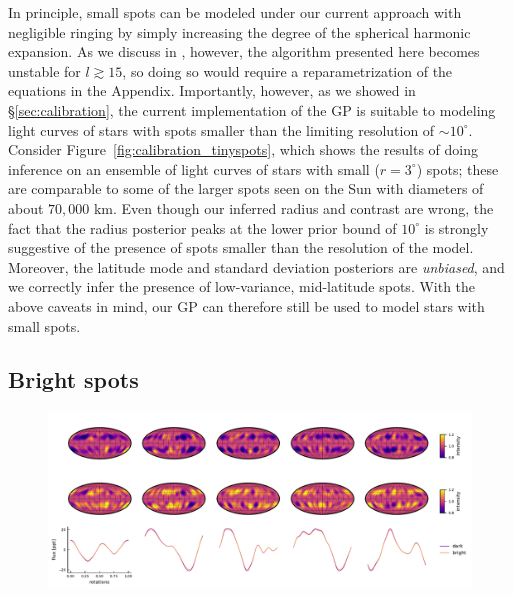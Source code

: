 \documentclass[modern,linenumbers]{aastex62}
\begin{document}
In principle, small spots can be modeled under our current
approach with negligible ringing by simply
increasing the degree of the spherical harmonic expansion. As we discuss in
\citep{JOSSPaper}, however, the algorithm presented here becomes
unstable for $l \gtrsim 15$, so doing so would require a reparametrization
of the equations in the Appendix. Importantly, however, as we showed in
\S\ref{sec:calibration}, the current implementation of the GP is suitable
to modeling light curves of stars with spots smaller than the limiting
resolution of $\sim 10^\circ$. Consider Figure~\ref{fig:calibration_tinyspots},
which shows the results of doing inference on an ensemble of light curves
of stars with small ($r = 3^\circ$) spots; these are comparable to some of
the larger spots seen on the Sun with diameters of about $70,000$ km.
Even though our inferred radius and contrast are wrong, the fact that the radius
posterior peaks
at the lower prior bound of $10^\circ$ is strongly suggestive of the presence
of spots smaller than the resolution of the model. Moreover, the
latitude mode and standard deviation posteriors are \emph{unbiased}, and we
correctly infer the presence of low-variance, mid-latitude spots.
With the above caveats in mind, our GP can therefore still be used to model
stars with small spots.

\subsection{Bright spots}
\label{sec:brightspots}

\begin{figure}[t!]
    \begin{centering}
        \includegraphics[width=\linewidth]{figures/brightspots.pdf}
    \end{centering}
\end{figure}
\end{document}
